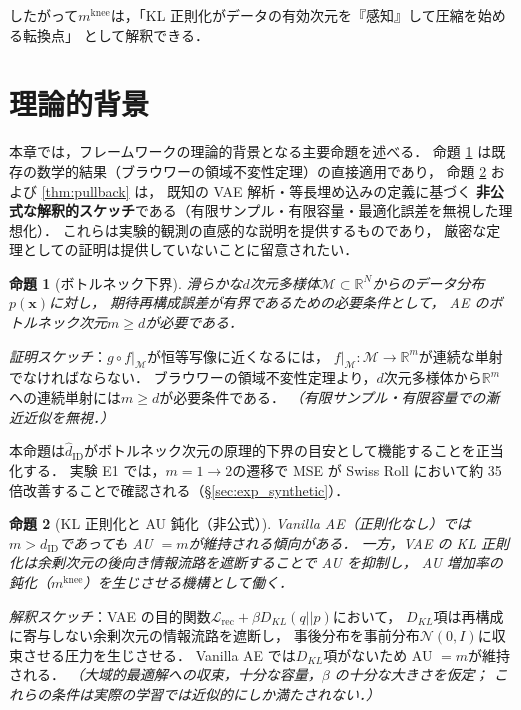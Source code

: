 \documentclass[11pt,a4paper]{jsarticle}
\newtheorem{proposition}{命題}
\newcommand{\dID}{d_{\mathrm{ID}}}
\newcommand{\R}{\mathbb{R}}
\newcommand{\mknee}{m^{\mathrm{knee}}}
\begin{document}
したがって$\mknee$は，「KL 正則化がデータの有効次元を『感知』して圧縮を始める転換点」
として解釈できる．

\section{理論的背景}\label{sec:theory}

本章では，フレームワークの理論的背景となる主要命題を述べる．
命題 \ref{thm:lower_bound} は既存の数学的結果（ブラウワーの領域不変性定理）の直接適用であり，
命題 \ref{thm:au} および \ref{thm:pullback} は，
既知の VAE 解析\cite{lucas2019elbo}・等長埋め込みの定義に基づく
\textbf{非公式な解釈的スケッチ}である（有限サンプル・有限容量・最適化誤差を無視した理想化）．
これらは実験的観測の直感的な説明を提供するものであり，
厳密な定理としての証明は提供していないことに留意されたい．

\begin{proposition}[ボトルネック下界]\label{thm:lower_bound}
滑らかな$d$次元多様体$\mathcal{M} \subset \R^N$からのデータ分布$p(\boldsymbol{x})$に対し，
期待再構成誤差が有界であるための必要条件として，
AE のボトルネック次元$m \geq d$が必要である．
\end{proposition}

\textit{証明スケッチ}：$g \circ f|_\mathcal{M}$が恒等写像に近くなるには，
$f|_\mathcal{M}: \mathcal{M} \to \R^m$が連続な単射でなければならない．
ブラウワーの領域不変性定理より，$d$次元多様体から$\R^m$への連続単射には$m \geq d$が必要条件である．
\textit{（有限サンプル・有限容量での漸近近似を無視．）}

本命題は$\hat{d}_\mathrm{ID}$がボトルネック次元の原理的下界の目安として機能することを正当化する．
実験 E1 では，$m = 1 \to 2$の遷移で MSE が Swiss Roll において約 35 倍改善することで確認される（§\ref{sec:exp_synthetic}）．

\begin{proposition}[KL 正則化と AU 鈍化（非公式）]\label{thm:au}
Vanilla AE（正則化なし）では$m > \dID$であっても AU $= m$が維持される傾向がある．
一方，VAE の KL 正則化は余剰次元の後向き情報流路を遮断することで AU を抑制し，
AU 増加率の鈍化（$\mknee$）を生じさせる機構として働く．
\end{proposition}

\textit{解釈スケッチ}：VAE の目的関数$\mathcal{L}_{\mathrm{rec}} + \beta D_{KL}(q||p)$において，
$D_{KL}$項は再構成に寄与しない余剰次元の情報流路を遮断し，
事後分布を事前分布$\mathcal{N}(0,I)$に収束させる圧力を生じさせる．
Vanilla AE では$D_{KL}$項がないため AU $= m$が維持される．
\textit{（大域的最適解への収束，十分な容量，$\beta$ の十分な大きさを仮定；
これらの条件は実際の学習では近似的にしか満たされない．）}
\end{document}
